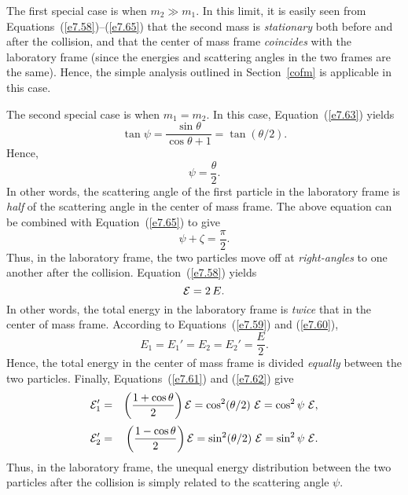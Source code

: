 The first special case is when $m_2\gg m_1$. In this limit, it is easily seen
from Equations~(\ref{e7.58})--(\ref{e7.65}) that the second mass is {\em stationary}\/
both before and after the collision, and that the center of mass frame
{\em coincides}\/ with the laboratory frame (since the energies and
scattering angles in the two frames are the same). Hence, the simple analysis
outlined in Section~\ref{cofm} is applicable in  this case.

The second special case is when $m_1=m_2$. In this case, Equation~(\ref{e7.63})
yields
\begin{equation}
\tan\psi = \frac{\sin\theta}{\cos\theta+1} =\tan(\theta/2).
\end{equation}
Hence,
\begin{equation}\label{e7.71}
\psi = \frac{\theta}{2}.
\end{equation}
In other words, the scattering angle of the first particle in the laboratory
frame is {\em half}\/ of the scattering angle in the center of mass frame.
The above equation can be combined with Equation~(\ref{e7.65}) to
give
\begin{equation}
\psi + \zeta =\frac{\pi}{2}.
\end{equation}
Thus, in the laboratory frame, the two particles move off at {\em right-angles}\/ to one another after the collision. Equation~(\ref{e7.58})
yields
\begin{equation}\label{e7.73}
{\cal E} = 2\,E.
\end{equation}
In other words, the total energy in the laboratory frame is {\em twice}\/ that
in the center of mass frame. According to Equations~(\ref{e7.59}) and (\ref{e7.60}),
\begin{equation}
E_1 = E_1' = E_2=E_2' = \frac{E}{2}.
\end{equation}
Hence,  the total energy in the center of mass frame is divided {\em equally}\/ between the two particles. Finally, Equations~(\ref{e7.61}) and (\ref{e7.62})
give
\begin{eqnarray}
{\cal E}_1' &=& \left(\frac{1+\cos\theta}{2}\right){\cal E} = \cos^2(\theta/2)\,\,{\cal E} = \cos^2\psi\,\,{\cal E},\\[0.5ex]
{\cal E}_2'&=& \left(\frac{1-\cos\theta}{2}\right){\cal E} = \sin^2(\theta/2)\,\,{\cal E} = \sin^2\psi\,\,{\cal E}.
\end{eqnarray}
Thus, in the laboratory frame, the unequal energy distribution between the two particles
after the collision  is simply related to
the scattering angle $\psi$.

